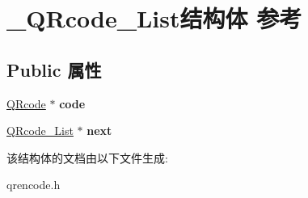 \hypertarget{struct___q_rcode___list}{\section{\-\_\-\-Q\-Rcode\-\_\-\-List结构体 参考}
\label{struct___q_rcode___list}
}
\subsection*{Public 属性}
\begin{DoxyCompactItemize}
\item 
\hypertarget{struct___q_rcode___list_a3a611fa842869b6e21c1b66d1d61daab}{\hyperlink{struct_q_rcode}{Q\-Rcode} $\ast$ {\bfseries code}}\label{struct___q_rcode___list_a3a611fa842869b6e21c1b66d1d61daab}

\item 
\hypertarget{struct___q_rcode___list_a58e12820cb046dc47b93402c24290348}{\hyperlink{struct___q_rcode___list}{Q\-Rcode\-\_\-\-List} $\ast$ {\bfseries next}}\label{struct___q_rcode___list_a58e12820cb046dc47b93402c24290348}

\end{DoxyCompactItemize}


该结构体的文档由以下文件生成\-:\begin{DoxyCompactItemize}
\item 
qrencode.\-h\end{DoxyCompactItemize}
